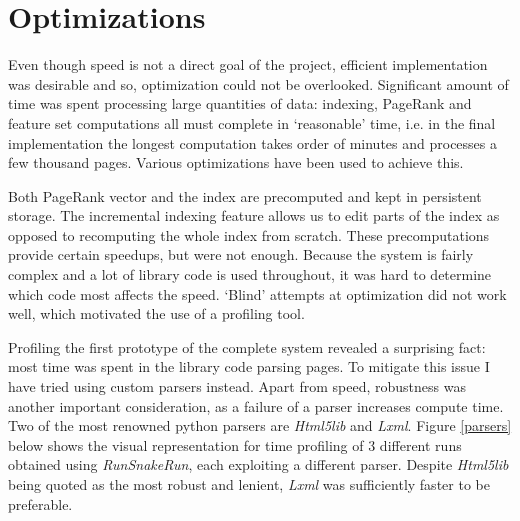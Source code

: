 \documentclass[12pt,notitlepage,twoside]{scrbook}
\begin{document}
\section{Optimizations}

Even though speed is not a direct goal of the project, efficient implementation
was desirable and so, optimization could not be overlooked. Significant
amount of time was spent processing large quantities of data: indexing, PageRank
and feature set computations all must complete in `reasonable' time, i.e. in the
final implementation the longest computation takes order of minutes and
processes a few thousand pages. Various optimizations have been used to achieve
this. 

Both PageRank vector and the index are precomputed and kept in
persistent storage. The incremental indexing feature allows us to edit parts of the
index as opposed to recomputing the whole index from scratch. These
precomputations provide certain speedups, but were not enough.  Because the
system is fairly complex and a lot of library code is used throughout, it was
hard to determine which code most affects the speed. `Blind' attempts at
optimization did not work well, which motivated the use of a profiling tool.

Profiling the first prototype of the complete system revealed a surprising
fact: most time was spent in the library code parsing pages. To mitigate this
issue I have tried using custom parsers instead. Apart from speed, robustness
was another important consideration, as a failure of a parser increases compute
time. Two of the most renowned python parsers are \textit{Html5lib} and
\textit{Lxml}. Figure
\ref{parsers} below shows the visual representation for time profiling of 3
different runs obtained using \textit{RunSnakeRun}, each exploiting a
different parser.  Despite \textit{Html5lib} being quoted as the most
robust and lenient, \textit{Lxml} was sufficiently faster to be preferable.
\end{document}
